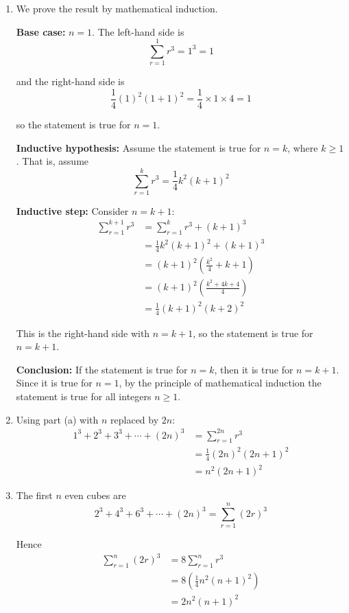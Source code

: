 \documentclass[leqno]{article}
\begin{document}
\begin{enumerate}[
  label=\textbf{\arabic*.},
  leftmargin=*,
  topsep=0pt,
  partopsep=0pt,
  parsep=0pt
]
\vspace*{10pt}

\begin{djsSolution}
\begin{enumerate}[label=\textbf{(\alph*)}]
  \item We prove the result by mathematical induction.

  \textbf{Base case:} $n=1$. The left-hand side is
  \[
  \sum_{r=1}^{1} r^3 = 1^3 = 1
  \]

  and the right-hand side is
  \[
  \frac{1}{4}(1)^2(1+1)^2=\frac14\times 1\times 4=1
  \]

  so the statement is true for $n=1$.

  \textbf{Inductive hypothesis:} Assume the statement is true for $n=k$, where $k \ge 1$. That is, assume
  \[
  \sum_{r=1}^{k} r^3=\frac14 k^2(k+1)^2
  \]

  \textbf{Inductive step:} Consider $n=k+1$:
  \begin{align*}
  \sum_{r=1}^{k+1} r^3
  &= \sum_{r=1}^{k} r^3 + (k+1)^3 \\
  &= \frac14 k^2(k+1)^2 + (k+1)^3 \\
  &= (k+1)^2\left(\frac{k^2}{4}+k+1\right) \\
  &= (k+1)^2\left(\frac{k^2+4k+4}{4}\right) \\
  &= \frac14 (k+1)^2(k+2)^2
  \end{align*}

  This is the right-hand side with $n=k+1$, so the statement is true for $n=k+1$.

  \textbf{Conclusion:} If the statement is true for $n=k$, then it is true for $n=k+1$. Since it is true for $n=1$, by the principle of mathematical induction the statement is true for all integers $n \ge 1$.

  \item Using part (a) with $n$ replaced by $2n$:
  \begin{align*}
  1^3+2^3+3^3+\cdots +(2n)^3
  &= \sum_{r=1}^{2n} r^3 \\
  &= \frac14 (2n)^2(2n+1)^2 \\
  &= n^2(2n+1)^2
  \end{align*}

  \item The first $n$ even cubes are
  \[
  2^3+4^3+6^3+\cdots +(2n)^3 = \sum_{r=1}^{n} (2r)^3
  \]

  Hence
  \begin{align*}
  \sum_{r=1}^{n} (2r)^3
  &= 8\sum_{r=1}^{n} r^3 \\
  &= 8\left(\frac14 n^2(n+1)^2\right) \\
  &= 2n^2(n+1)^2
  \end{align*}


\end{enumerate}
\end{djsSolution}
\end{enumerate}
\end{document}
